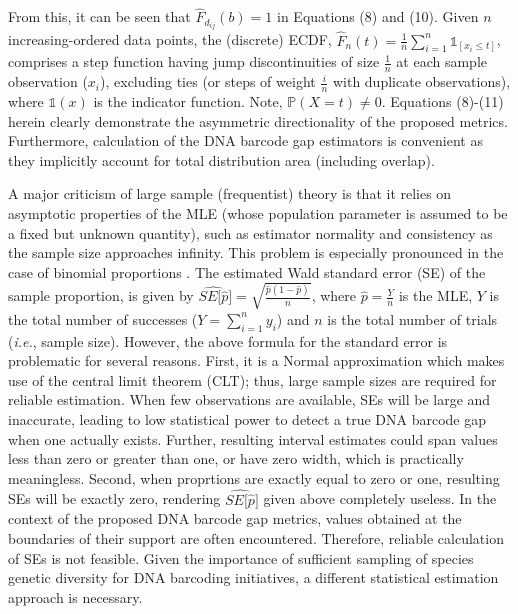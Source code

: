 \documentclass[12pt]{article}
\begin{document}
From this, it can be seen that $\hat{F}_{d_{ij}}(b) = 1$ in Equations (8) and (10). Given $n$ \\ increasing-ordered data points, the (discrete) ECDF, $\hat{F}_n(t) = \frac{1}{n}\sum_{i = 1}^n\mathds{1}_{[x_i \leq t]}$, comprises a step function having jump discontinuities of size $\frac{1}{n}$ at each sample observation ($x_i$), excluding ties (or steps of weight $\frac{i}{n}$ with duplicate observations), where $\mathds{1}(x)$ is the indicator function. Note, $\mathbb{P}(X = t) \neq 0$. Equations (8)-(11) herein clearly demonstrate the asymmetric directionality of the proposed metrics. Furthermore, calculation of the DNA barcode gap estimators is convenient as they implicitly account for total distribution area (including overlap).

A major criticism of large sample (frequentist) theory is that it relies on asymptotic properties of the MLE (whose population parameter is assumed to be a fixed but unknown quantity), such as estimator normality and consistency as the sample size approaches infinity. This problem is especially pronounced in the case of binomial proportions \citep{newcombe1998confidence}. The estimated Wald standard error (SE) of the sample proportion, is given by $\widehat{SE[\hat{p}}] = \sqrt{\frac{\hat{p}(1 - \hat{p})}{n}}$, where $\hat{p} = \frac{Y}{n}$ is the MLE, $Y$ is the total number of successes ($Y = \sum_{i=1}^n{y_i}$) and $n$ is the total number of trials (\textit{i.e.}, sample size). However, the above formula for the standard error is problematic for several reasons. First, it is a Normal approximation which makes use of the central limit theorem (CLT); thus, large sample sizes are required for reliable estimation. When few observations are available, SEs will be large and inaccurate, leading to low statistical power to detect a true DNA barcode gap when one actually exists. Further, resulting interval estimates could span values less than zero or greater than one, or have zero width, which is practically meaningless. Second, when proprtions are exactly equal to zero or one, resulting SEs will be exactly zero, rendering $\widehat{SE[\hat{p}}]$ given above completely useless. In the context of the proposed DNA barcode gap metrics, values obtained at the boundaries of their support are often encountered. Therefore, reliable calculation of SEs is not feasible. Given the importance of sufficient sampling of species genetic diversity for DNA barcoding initiatives, a different statistical estimation approach is necessary. 
\end{document}
